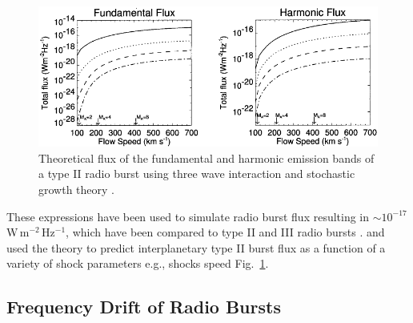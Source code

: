 \begin{figure}[t!]
\begin{center}
\includegraphics[scale=1.1, trim=0cm 0cm 0cm 0.5cm]{images/Cairns2003.pdf}
\caption[Theoretically predicted radio burst fluxes]{Theoretical flux of the fundamental and harmonic emission bands of a type II radio burst using three wave interaction and stochastic growth theory \citet{cairns2003}.}
\label{fig:cairns_emissivity}
\end{center}
\end{figure}
These expressions have been used to simulate radio burst flux resulting in $\sim10^{-17}$\,W\,m$^{-2}$\,Hz$^{-1}$, which have been compared to type II and III radio bursts \citep{schmidt2012, knock2001}. \citet{knock2003} and \citet{cairns2003} used the theory to predict interplanetary type II burst flux as a function of a variety of shock parameters e.g., shocks speed Fig.~\ref{fig:cairns_emissivity}.

\subsection{Frequency Drift of Radio Bursts}


